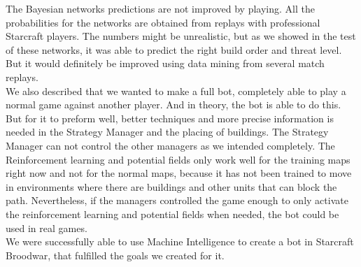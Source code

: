 The Bayesian networks predictions are not improved by playing. All the probabilities for the networks are obtained from replays with professional Starcraft players. The numbers might be unrealistic, but as we showed in the test of these networks, it was able to predict the right build order and threat level. But it would definitely be improved using data mining from several match replays. \\

We also described that we wanted to make a full bot, completely able to play a normal game against another player. And in theory, the bot is able to do this. But for it to preform well, better techniques and more precise information is needed in the Strategy Manager and the placing of buildings. The Strategy Manager can not control the other managers as we intended completely. The Reinforcement learning and potential fields only work well for the training maps right now and not for the normal maps, because it has not been trained to move in environments where there are buildings and other units that can block the path. Nevertheless, if the managers controlled the game enough to only activate the reinforcement learning and potential fields when needed, the bot could be used in real games.\\

We were successfully able to use Machine Intelligence to create a bot in Starcraft Broodwar, that fulfilled the goals we created for it.


